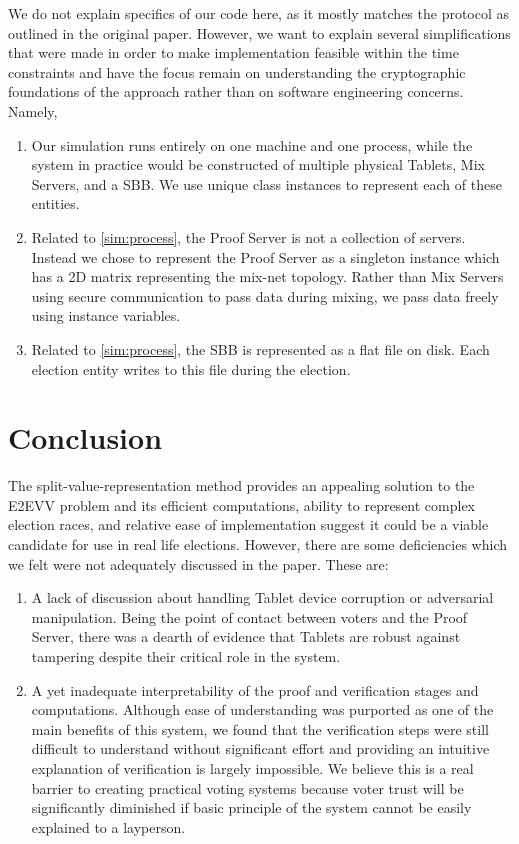 \documentclass{article}
\begin{document}
We do not explain specifics of our code here, as it mostly matches the protocol as outlined in the original paper. However, we want to explain several simplifications that were made in order to make implementation feasible within the time constraints and have the focus remain on understanding the cryptographic foundations of the approach rather than on software engineering concerns. Namely,
\begin{enumerate}
\item \label{sim:process}
    Our simulation runs entirely on one machine and one process, while the system in practice would be constructed of multiple physical Tablets, Mix Servers, and a SBB. We use unique class instances to represent each of these entities.
\item
    Related to \ref{sim:process}, the Proof Server is not a collection of servers. Instead we chose to represent the Proof Server as a singleton instance which has a 2D matrix representing the mix-net topology. Rather than Mix Servers using secure communication to pass data during mixing, we pass data freely using instance variables.
\item
    Related to \ref{sim:process}, the SBB is represented as a flat file on disk. Each election entity writes to this file during the election.
\end{enumerate}

\section{Conclusion}
The split-value-representation method provides an appealing solution to the E2EVV problem and its efficient computations, ability to represent complex election races, and relative ease of implementation suggest it could be a viable candidate for use in real life elections. However, there are some deficiencies which we felt were not adequately discussed in the paper. These are:

\begin{enumerate}
\item
    A lack of discussion about handling Tablet device corruption or adversarial manipulation. Being the point of contact between voters and the Proof Server, there was a dearth of evidence that Tablets are robust against tampering despite their critical role in the system.
\item
    A yet inadequate interpretability of the proof and verification stages and computations. Although ease of understanding was purported as one of the main benefits of this system, we found that the verification steps were still difficult to understand without significant effort and providing an intuitive explanation of verification is largely impossible. We believe this is a real barrier to creating practical voting systems because voter trust will be significantly diminished if basic principle of the system cannot be easily explained to a layperson.
\end{enumerate}
\end{document}
